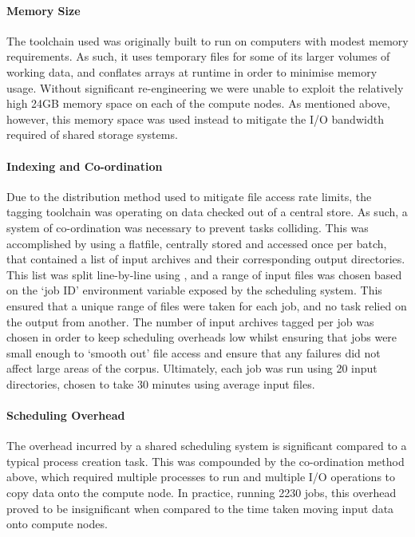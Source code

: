 \paragraph{Memory Size}
The toolchain used was originally built to run on computers with modest memory requirements.  As such, it uses temporary files for some of its larger volumes of working data, and conflates arrays at runtime in order to minimise memory usage.
Without significant re-engineering we were unable to exploit the relatively high 24GB memory space on each of the compute nodes.  As mentioned above, however, this memory space was used instead to mitigate the I/O bandwidth required of shared storage systems.





\paragraph{Indexing and Co-ordination}
Due to the distribution method used to mitigate file access rate limits, the tagging toolchain was operating on data checked out of a central store.  As such, a system of co-ordination was necessary to prevent tasks colliding.
This was accomplished by using a flatfile, centrally stored and accessed once per batch, that contained a list of input archives and their corresponding output directories.  This list was split line-by-line using , and a range of input files was chosen based on the `job ID' environment variable exposed by the scheduling system.  This ensured that a unique range of files were taken for each job, and no task relied on the output from another.
The number of input archives tagged per job was chosen in order to keep scheduling overheads low whilst ensuring that jobs were small enough to `smooth out' file access and ensure that any failures did not affect large areas of the corpus.  Ultimately, each job was run using 20 input directories, chosen to take 30 minutes using average input files.




\paragraph{Scheduling Overhead}
The overhead incurred by a shared scheduling system is significant compared to a typical process creation task.  This was compounded by the co-ordination method above, which required multiple processes to run and multiple I/O operations to copy data onto the compute node.
In practice, running 2230 jobs, this overhead proved to be insignificant when compared to the time taken moving input data onto compute nodes.





